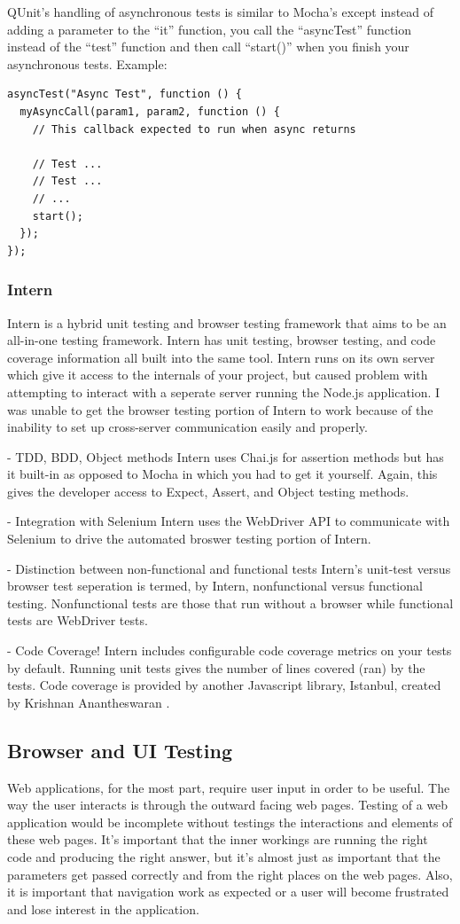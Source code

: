 \documentclass[11pt]{article}
\begin{document}
QUnit's handling of asynchronous tests is similar to Mocha's except instead of adding a parameter to the ``it'' function, you call the ``asyncTest'' function instead of the ``test'' function and then call ``start()'' when you finish your asynchronous tests. Example:
\begin{lstlisting}
asyncTest("Async Test", function () {
  myAsyncCall(param1, param2, function () {
    // This callback expected to run when async returns

    // Test ...
    // Test ...
    // ...
    start();
  });
});
\end{lstlisting}


\subsubsection{Intern\cite{InternIO}}
Intern is a hybrid unit testing and browser testing framework that aims to be an all-in-one testing framework. Intern has unit testing, browser testing, and code coverage information all built into the same tool. Intern runs on its own server which give it access to the internals of your project, but caused problem with attempting to interact with a seperate server running the Node.js application. I was unable to get the browser testing portion of Intern to work because of the inability to set up cross-server communication easily and properly.

- TDD, BDD, Object methods
Intern uses Chai.js for assertion methods but has it built-in as opposed to Mocha in which you had to get it yourself. Again, this gives the developer access to Expect, Assert, and Object testing methods.

- Integration with Selenium
Intern uses the WebDriver API to communicate with Selenium to drive the automated broswer testing portion of Intern.

- Distinction between non-functional and functional tests
Intern's unit-test versus browser test seperation is termed, by Intern, nonfunctional versus functional testing. Nonfunctional tests are those that run without a browser while functional tests are WebDriver tests.

- Code Coverage!
Intern includes configurable code coverage metrics on your tests by default. Running unit tests gives the number of lines covered (ran) by the tests. Code coverage is provided by another Javascript library, Istanbul, created by Krishnan Anantheswaran \cite{Istanbul}.

\subsection{Browser and UI Testing}
Web applications, for the most part, require user input in order to be useful. The way the user interacts is through the outward facing web pages. Testing of a web application would be incomplete without testings the interactions and elements of these web pages. It's important that the inner workings are running the right code and producing the right answer, but it's almost just as important that the parameters get passed correctly and from the right places on the web pages. Also, it is important that navigation work as expected or a user will become frustrated and lose interest in the application.
\end{document}
